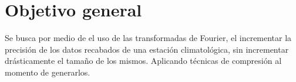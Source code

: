 \section{Objetivo general}

Se busca por medio de el uso de las transformadas de Fourier, el incrementar la precisión de los datos recabados de una estación climatológica, sin incrementar drásticamente el tamaño de los mismos. Aplicando técnicas de compresión al momento de generarlos.
